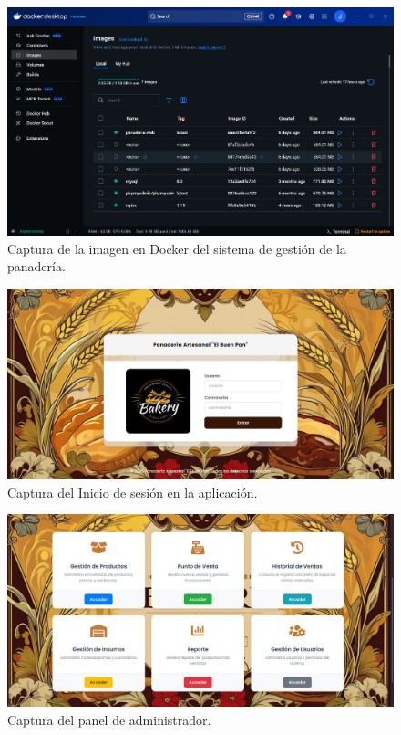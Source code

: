 \documentclass[conference]{IEEEtran}
\begin{document}
\begin{figure}[htbp]
\centerline{\includegraphics[width=\columnwidth]{images/docker.png}}
\caption{Captura de la imagen en Docker del sistema de gestión de la panadería.}
\label{fig:clases}
\end{figure}

\begin{figure}[htbp]
\centerline{\includegraphics[width=\columnwidth]{images/login.png}}
\caption{Captura del Inicio de sesión en la aplicación.}
\label{fig:clases}
\end{figure}

\begin{figure}[htbp]
\centerline{\includegraphics[width=\columnwidth]{images/control_admin.png}}
\caption{Captura del panel de administrador.}
\label{fig:clases}
\end{figure}
\end{document}
